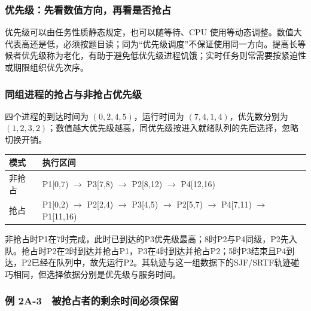 \subsubsection{优先级：先看数值方向，再看是否抢占}\label{OS02-auto-2}

优先级可以由任务性质静态规定，也可以随等待、CPU 使用等动态调整。数值大代表高还是低，必须按题目读；同为``优先级调度''不保证使用同一方向。提高长等候者优先级称为老化，有助于避免低优先级进程饥饿；实时任务则常需要按紧迫性或期限组织优先次序。

\subsubsection{同组进程的抢占与非抢占优先级}\label{OS02-course-priority}

四个进程的到达时间为 \((0,2,4,5)\)，运行时间为 \((7,4,1,4)\)，优先数分别为 \((1,2,3,2)\)；数值越大优先级越高，同优先级按进入就绪队列的先后选择，忽略切换开销。

\par\medskip\noindent\begin{minipage}{\linewidth}\fontsize{9.3}{12}\selectfont\begin{tabularx}{\linewidth}{@{}YY@{}}
\toprule\noalign{}
模式 & 执行区间 \\
\midrule\noalign{}


非抢占 & P1{[}0,7) \ensuremath{\to} P3{[}7,8) \ensuremath{\to} P2{[}8,12) \ensuremath{\to} P4{[}12,16) \\
抢占 & P1{[}0,2) \ensuremath{\to} P2{[}2,4) \ensuremath{\to} P3{[}4,5) \ensuremath{\to} P2{[}5,7) \ensuremath{\to} P4{[}7,11) \ensuremath{\to} P1{[}11,16) \\
\bottomrule\end{tabularx}
\end{minipage}\par\medskip

非抢占时P1在7时完成，此时已到达的P3优先级最高；8时P2与P4同级，P2先入队。抢占时P2在2时到达并抢占P1，P3在4时到达并抢占P2；5时P3结束且P4到达，P2已经在队列中，故先运行P2。其轨迹与这一组数据下的SJF/SRTF轨迹碰巧相同，但选择依据分别是优先级与服务时间。

\subsubsection{例 2A-3　被抢占者的剩余时间必须保留}\label{OS02-ex2-3}

